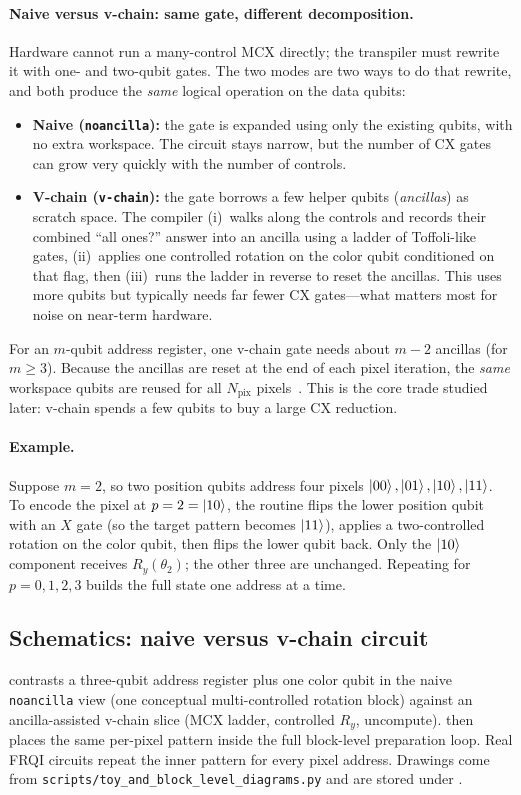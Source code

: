 \paragraph{Naive versus v-chain: same gate, different decomposition.}
Hardware cannot run a many-control MCX directly; the transpiler must rewrite it with one- and two-qubit gates. The two modes are two ways to do that rewrite, and both produce the \emph{same} logical operation on the data qubits:
\begin{itemize}
  \item \textbf{Naive (\texttt{noancilla}):} the gate is expanded using only the existing qubits, with no extra workspace. The circuit stays narrow, but the number of CX gates can grow very quickly with the number of controls.
  \item \textbf{V-chain (\texttt{v-chain}):} the gate borrows a few helper qubits (\emph{ancillas}) as scratch space. The compiler (i)~walks along the controls and records their combined ``all ones?'' answer into an ancilla using a ladder of Toffoli-like gates, (ii)~applies one controlled rotation on the color qubit conditioned on that flag, then (iii)~runs the ladder in reverse to reset the ancillas. This uses more qubits but typically needs far fewer CX gates---what matters most for noise on near-term hardware.
\end{itemize}
For an $m$-qubit address register, one v-chain gate needs about $m-2$ ancillas (for $m\ge 3$). Because the ancillas are reset at the end of each pixel iteration, the \emph{same} workspace qubits are reused for all $N_{\mathrm{pix}}$ pixels~\cite{Vale2023MCSU2,Azevedo2024LowDepthMCG}. This is the core trade studied later: v-chain spends a few qubits to buy a large CX reduction.

\paragraph{Example.}
Suppose $m=2$, so two position qubits address four pixels $\ket{00},\ket{01},\ket{10},\ket{11}$. To encode the pixel at $p=2=\ket{10}$, the routine flips the lower position qubit with an $X$ gate (so the target pattern becomes $\ket{11}$), applies a two-controlled rotation on the color qubit, then flips the lower qubit back. Only the $\ket{10}$ component receives $R_y(\theta_2)$; the other three are unchanged. Repeating for $p=0,1,2,3$ builds the full state one address at a time.

\subsection{Schematics: naive versus v-chain circuit}
 contrasts a three-qubit address register plus one color qubit in the naive \texttt{noancilla} view (one conceptual multi-controlled rotation block) against an ancilla-assisted v-chain slice (MCX ladder, controlled $R_y$, uncompute).  then places the same per-pixel pattern inside the full block-level preparation loop. Real FRQI circuits repeat the inner pattern for every pixel address. Drawings come from \texttt{scripts/toy\_and\_block\_level\_diagrams.py} and are stored under .

